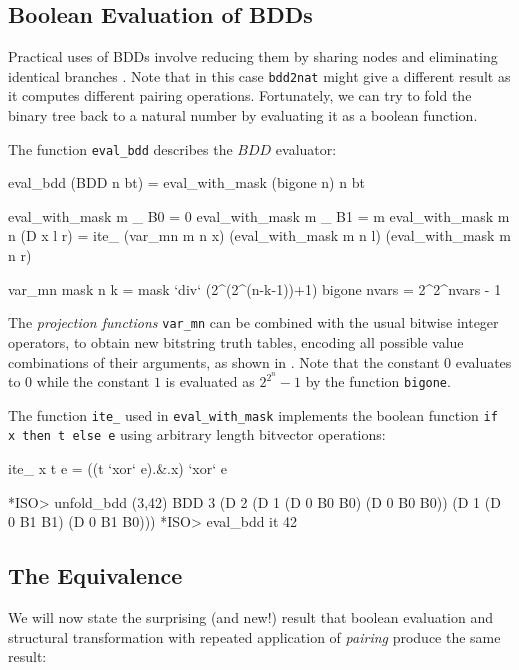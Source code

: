 \documentclass[]{INCLUDES/llncs}
\begin{document}
\subsection{Boolean Evaluation of BDDs}
Practical uses of BDDs involve reducing them by
sharing nodes and eliminating identical
branches \cite{bryant86graphbased}.
Note that in this case {\tt bdd2nat} 
might give a different result as it computes
different pairing operations. 
Fortunately,
we can try to fold the binary tree 
back to a natural number
by evaluating it as a boolean
function.

The function {\tt eval\_bdd} describes the $BDD$ evaluator:
\begin{code}
eval_bdd (BDD n bt) = eval_with_mask (bigone n) n bt
 
eval_with_mask m _ B0 = 0 
eval_with_mask m _ B1 = m
eval_with_mask m n (D x l r) = 
  ite_ (var_mn m n x) 
         (eval_with_mask m n l) 
         (eval_with_mask m n r)
         
var_mn mask n k = mask `div` (2^(2^(n-k-1))+1)
bigone nvars = 2^2^nvars - 1         
\end{code}

The {\em projection functions} {\tt var\_mn}
can be combined with the usual bitwise integer operators, 
to obtain new bitstring truth tables, 
encoding all possible value combinations of their arguments, 
as shown in \cite{knuth06draft}.
Note that the constant $0$ evaluates to $0$ while the constant $1$
is evaluated as $2^{2^n}-1$ by the function {\tt bigone}.

The function {\tt ite\_} used in {\tt eval\_with\_mask} 
implements the boolean function  {\tt if x then t else e}
using arbitrary length bitvector operations:
\begin{code}
ite_ x t e = ((t `xor` e).&.x) `xor` e
\end{code}


\begin{codex}
*ISO> unfold_bdd (3,42)
BDD 3 (D 2 (D 1 (D 0 B0 B0) (D 0 B0 B0)) 
           (D 1 (D 0 B1 B1) (D 0 B1 B0)))
*ISO> eval_bdd it
42
\end{codex}

\subsection{The Equivalence} \label{equiv}
We will now state the surprising (and new!) result
that boolean evaluation and structural transformation with
repeated application of
{\em pairing}
produce the same result:
\end{document}
